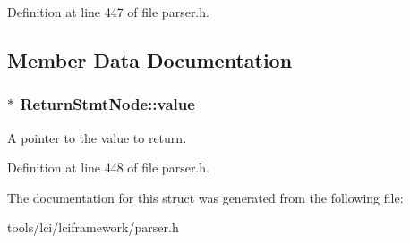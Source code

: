 Definition at line 447 of file parser.\-h.



\subsection{Member Data Documentation}
\hypertarget{struct_return_stmt_node_ac610b54406ae3bc54e3d5c4e9fcb1d2e}{
\subsubsection[{value}]{$\ast$ {\bf Return\-Stmt\-Node\-::value}}}\label{struct_return_stmt_node_ac610b54406ae3bc54e3d5c4e9fcb1d2e}
A pointer to the value to return. 

Definition at line 448 of file parser.\-h.



The documentation for this struct was generated from the following file\-:\begin{DoxyCompactItemize}
\item 
tools/lci/lciframework/parser.\-h\end{DoxyCompactItemize}
